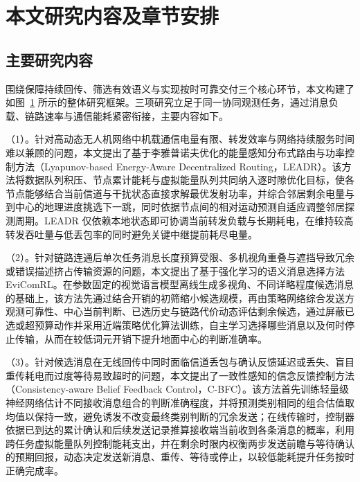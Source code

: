 \section{本文研究内容及章节安排}
\subsection{主要研究内容}

围绕保障持续回传、筛选有效语义与实现按时可靠交付三个核心环节，本文构建了如图~\ref{fig:intro:framework} 所示的整体研究框架。三项研究立足于同一协同观测任务，通过消息负载、链路速率与通信能耗紧密衔接，主要内容如下。

（1）\ResearchOneTitle{}。针对高动态无人机网络中机载通信电量有限、转发效率与网络持续服务时间难以兼顾的问题，本文提出了基于李雅普诺夫优化的能量感知分布式路由与功率控制方法（Lyapunov-based Energy-Aware Decentralized Routing，LEADR）。该方法将数据队列积压、节点累计能耗与虚拟能量队列共同纳入逐时隙优化目标，使各节点能够结合当前信道与干扰状态直接求解最优发射功率，并综合邻居剩余电量与到中心的地理进度挑选下一跳，同时依据节点间的相对运动预测自适应调整邻居探测周期。LEADR 仅依赖本地状态即可协调当前转发负载与长期耗电，在维持较高转发吞吐量与低丢包率的同时避免关键中继提前耗尽电量。

（2）\ResearchTwoTitle{}。针对链路连通后单次任务消息长度预算受限、多机视角重叠与遮挡导致冗余或错误描述挤占传输资源的问题，本文提出了基于强化学习的语义消息选择方法 EviComRL。在参数固定的视觉语言模型离线生成多视角、不同详略程度候选消息的基础上，该方法先通过结合开销的初筛缩小候选规模，再由策略网络综合发送方观测可靠性、中心当前判断、已选历史与链路代价动态评估剩余候选，通过屏蔽已选或超预算动作并采用近端策略优化算法训练，自主学习选择哪些消息以及何时停止传输，从而在较低词元开销下提升地面中心的判断准确率。

（3）\ResearchThreeTitle{}。针对候选消息在无线回传中同时面临信道丢包与确认反馈延迟或丢失、盲目重传耗电而过度等待易致超时的问题，本文提出了一致性感知的信念反馈控制方法（Consistency-aware Belief Feedback Control，C-BFC）。该方法首先训练轻量级神经网络估计不同接收消息组合的判断准确程度，并将预测类别相同的组合估值取均值以保持一致，避免诱发不改变最终类别判断的冗余发送；在线传输时，控制器依据已到达的累计确认和后续发送记录推算接收端当前收到各条消息的概率，利用跨任务虚拟能量队列控制能耗支出，并在剩余时限内权衡两步发送前瞻与等待确认的预期回报，动态决定发送新消息、重传、等待或停止，以较低能耗提升任务按时正确完成率。

\begin{figure}[!htb]
\centering

\label{fig:intro:framework}
\end{figure}

